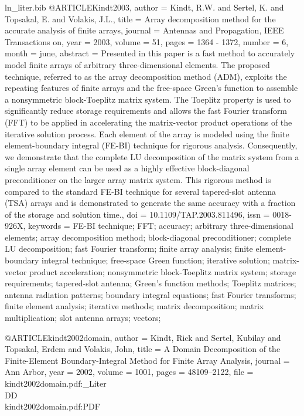 \begin{filecontents*}{ln_liter.bib}
@ARTICLE{Kindt2003,
  author = {Kindt, R.W. and Sertel, K. and Topsakal, E. and Volakis, J.L.},
  title = {Array decomposition method for the accurate analysis of finite arrays},
  journal = {Antennas and Propagation, IEEE Transactions on},
  year = {2003},
  volume = {51},
  pages = { 1364 - 1372},
  number = {6},
  month = {june},
  abstract = {Presented in this paper is a fast method to accurately model finite
	arrays of arbitrary three-dimensional elements. The proposed technique,
	referred to as the array decomposition method (ADM), exploits the
	repeating features of finite arrays and the free-space Green's function
	to assemble a nonsymmetric block-Toeplitz matrix system. The Toeplitz
	property is used to significantly reduce storage requirements and
	allows the fast Fourier transform (FFT) to be applied in accelerating
	the matrix-vector product operations of the iterative solution process.
	Each element of the array is modeled using the finite element-boundary
	integral (FE-BI) technique for rigorous analysis. Consequently, we
	demonstrate that the complete LU decomposition of the matrix system
	from a single array element can be used as a highly effective block-diagonal
	preconditioner on the larger array matrix system. This rigorous method
	is compared to the standard FE-BI technique for several tapered-slot
	antenna (TSA) arrays and is demonstrated to generate the same accuracy
	with a fraction of the storage and solution time.},
  doi = {10.1109/TAP.2003.811496},
  issn = {0018-926X},
  keywords = { FE-BI technique; FFT; accuracy; arbitrary three-dimensional elements;
	array decomposition method; block-diagonal preconditioner; complete
	LU decomposition; fast Fourier transform; finite array analysis;
	finite element-boundary integral technique; free-space Green function;
	iterative solution; matrix-vector product acceleration; nonsymmetric
	block-Toeplitz matrix system; storage requirements; tapered-slot
	antenna; Green's function methods; Toeplitz matrices; antenna radiation
	patterns; boundary integral equations; fast Fourier transforms; finite
	element analysis; iterative methods; matrix decomposition; matrix
	multiplication; slot antenna arrays; vectors;}
}

@ARTICLE{kindt2002domain,
  author = {Kindt, Rick and Sertel, Kubilay and Topsakal, Erdem and Volakis,
	John},
  title = {A Domain Decomposition of the Finite-Element Boundary-Integral Method
	for Finite Array Analysis},
  journal = {Ann Arbor},
  year = {2002},
  volume = {1001},
  pages = {48109--2122},
  file = {kindt2002domain.pdf:_Liter\\DD\\kindt2002domain.pdf:PDF}
}


\end{filecontents*}
